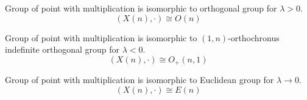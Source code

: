 \documentclass[../main.tex]{subfiles}
\begin{document}
\begin{proposition}
Group of point with multiplication is isomorphic to orthogonal group for $\lambda>0$.
\begin{equation*}
\left(X\left(n\right),\cdot\right)\cong O\left(n\right)
\end{equation*}
\end{proposition}
\begin{proposition}
Group of point with multiplication is isomorphic to $\left(1,n\right)$-orthochronus indefinite orthogonal group for $\lambda<0$.
\begin{equation*}
\left(X\left(n\right),\cdot\right)\cong O_+\left(n,1\right)
\end{equation*}
\end{proposition}
\begin{proposition}
Group of point with multiplication is isomorphic to Euclidean group for $\lambda\to0$.
\begin{equation*}
\left(X\left(n\right),\cdot\right)\cong E\left(n\right)
\end{equation*}
\end{proposition}
\end{document}
